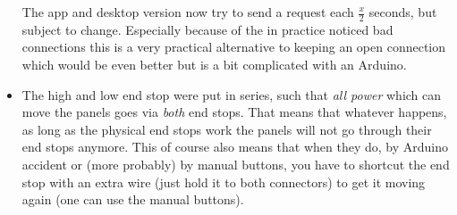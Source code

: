 \begin{itemize}
        The app and desktop version now try to send a request each $\frac{x}{2}$ seconds, but subject to change.
        Especially because of the in practice noticed bad connections this is a very practical alternative to keeping an open connection which would be even better but is a bit complicated with an Arduino.
        \item The high and low end stop were put in series, such that \textit{all power} which can move the panels goes via \textit{both} end stops.
        That means that whatever happens, as long as the physical end stops work the panels will not go through their end stops anymore.
        This of course also means that when they do, by Arduino accident or (more probably) by manual buttons, you have to shortcut the end stop with an extra wire (just hold it to both connectors) to get it moving again (one can use the manual buttons).
    \end{itemize}